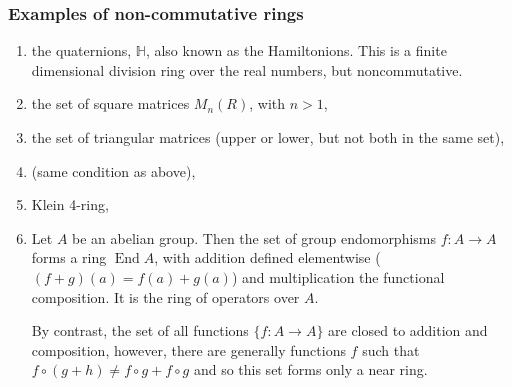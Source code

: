 \documentclass[12pt]{article}
\newcommand{\sH}[0]{\mathbb{H}}
\DeclareMathOperator{\End}{End}
\begin{document}
\subsubsection*{Examples of non-commutative rings}
\begin{enumerate}
\item the quaternions, $\sH$, also known as the Hamiltonions.  This is a finite dimensional division ring 
over the real numbers, but noncommutative.  
\item the set of square matrices $M_n(R)$, with $n>1$,
\item the set of triangular matrices (upper or lower, but not both in the same set), 
\item {} (same condition as above),
\item Klein 4-ring,
\item Let $A$ be an abelian group.  Then the set of group endomorphisms $f:A\to A$ forms a ring $\End A$, 
with addition defined elementwise ($(f+g)(a)=f(a)+g(a)$) and multiplication the functional composition.  
It is the ring of operators over $A$.

By contrast, the set of all functions $\{f:A\to A\}$ are closed to addition and composition, however,
there are generally functions $f$ such that $f\circ(g+h)\neq f\circ g+f\circ g$ and so this set
forms only a near ring.
\end{enumerate}
\end{document}
